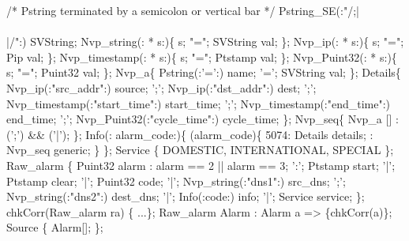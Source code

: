 % 
\begin{code}
/* Pstring terminated by a semicolon or vertical bar */
 Pstring\_SE(:"/;|\\\\|/":) SVString;
\mbox{}
 Nvp\_string(: * s:)\{
  s; "="; SVString val;
\};
\mbox{}
 Nvp\_ip(: * s:)\{
  s; "="; Pip val;
\};
\mbox{}
 Nvp\_timestamp(: * s:)\{
  s; "="; Ptstamp val;
\};
\mbox{}
 Nvp\_Puint32(: * s:)\{
  s; "="; Puint32 val;
\};
\mbox{}
 Nvp\_a\{
      Pstring(:'=':) name;
 '='; SVString       val;
\};
\mbox{}
 Details\{
      Nvp\_ip(:"src\_addr":) source;
';';  Nvp\_ip(:"dst\_addr":) dest;
';';  Nvp\_timestamp(:"start\_time":) start\_time;
';';  Nvp\_timestamp(:"end\_time":)   end\_time;
';';  Nvp\_Puint32(:"cycle\_time":)   cycle\_time;
\};
\mbox{}
 Nvp\_seq\{
  Nvp\_a [] : (';') && ('|');
\};
\mbox{}
 Info(: alarm\_code:)\{
   (alarm\_code)\{
     5074: Details   details;
    :   Nvp\_seq   generic;
  \}
\};
\mbox{}
 Service \{
   DOMESTIC,
   INTERNATIONAL,
   SPECIAL
\};
\mbox{}
 Raw\_alarm \{
       Puint32 alarm : alarm == 2 || alarm == 3;
 ':';   Ptstamp start;
 '|';   Ptstamp clear;
 '|';  Puint32      code;
 '|';  Nvp\_string(:"dns1":) src\_dns;
 ';';  Nvp\_string(:"dns2":) dest\_dns;
 '|';  Info(:code:) info;
 '|';  Service      service;
\};
\mbox{}
 chkCorr(Raw\_alarm ra) \{ ...\};
\mbox{}
  Raw\_alarm Alarm :
         Alarm a => \{chkCorr(a)\};
\mbox{}
  Source \{
  Alarm[];
\};
\end{code}
